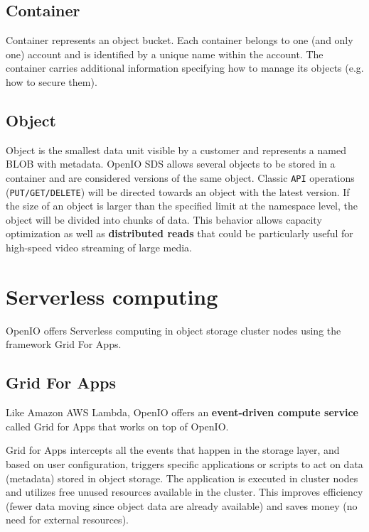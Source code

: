     \subsection{Container}
    Container represents an object bucket. Each container belongs to one (and only one) account and is identified by a unique name within the account. The container carries additional information specifying how to manage its objects (e.g. how to secure them)\cite{oioCoreSolution}.

    \subsection{Object}
    Object is the smallest data unit visible by a customer and represents a named BLOB with metadata. OpenIO SDS allows several objects to be stored in a container and are considered versions of the same object. Classic \texttt{API} operations (\texttt{PUT/GET/DELETE}) will be directed towards an object with the latest version. If the size of an object is larger than the specified limit at the namespace level, the object will be divided into chunks of data. This behavior allows capacity optimization as well as \textbf{distributed reads} that could be particularly useful for high-speed video streaming of large media\cite{oioCoreSolution}.


    \section{Serverless computing}
    OpenIO offers Serverless computing in object storage cluster nodes using the framework Grid For Apps.
    \subsection{Grid For Apps}\label{sec:oioGridForApps}

    Like Amazon AWS Lambda, OpenIO offers an \textbf{event-driven compute service} called Grid for Apps that works on top of OpenIO.

    Grid for Apps intercepts all the events that happen in the storage layer, and based on user configuration, triggers specific applications or scripts to act on data (metadata) stored in object storage\cite{oioNextGen}. The application is executed in cluster nodes and utilizes free unused resources available in the cluster. This improves efficiency (fewer data moving since object data are already available) and saves money (no need for external resources)\cite{oioNextGen}.

